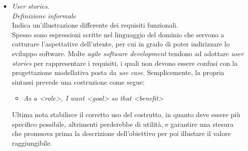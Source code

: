\documentclass{article}
\begin{document}
\begin{itemize}[label={-}]
    \item \textit{User stories}.\vspace*{7pt}\\\textit{Definizione informale}\\Indica un'illustrazione differente dei requisiti funzionali.\vspace*{14pt}\\Spesso sono espressioni scritte nel linguaggio del dominio che servono a catturare l'aspettative dell'utente, per cui in grado di poter indirizzare lo sviluppo software. Molte \textit{agile software development} tendono ad adottare \textit{user stories} per rappresentare i requisiti, i quali non devono essere confusi con la progettazione modellativa posta da \textit{use case}. Semplicemente, la propria sintassi prevede una costruzione come segue: \begin{itemize}[label={ }, leftmargin=1cm] \item \textit{As a <role>, I want <goal> so that <benefit>}\end{itemize} Ultima nota stabilisce il corretto uso del costrutto, in quanto deve essere più specifico possibile, altrimenti perderebbe di utilità, e garantire una stesura che promuova prima la descrizione dell'obiettivo per poi illustare il valore raggiungibile.
\end{itemize}
\end{document}
